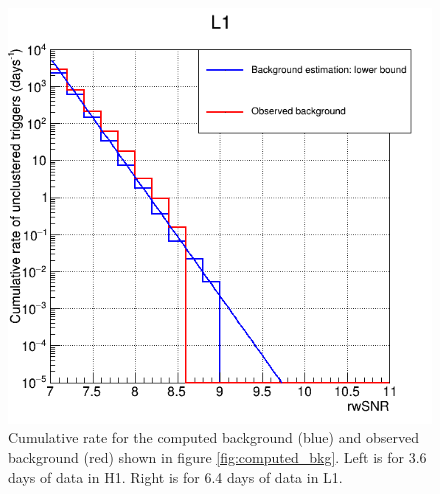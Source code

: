 \begin{figure}
\begin{minipage}{0.45\linewidth}
    \includegraphics[width=\linewidth]{sectionFAR/O4/cRateCompCumulL1_730000.png}
  \end{minipage}
  \caption{Cumulative rate for the computed background (blue) and observed background (red) shown in figure \ref{fig:computed_bkg}.
    Left is for 3.6 days of data in H1.
    Right is for 6.4 days of data in L1.}
  \label{fig:computed_bkg_cumul}
\end{figure}




